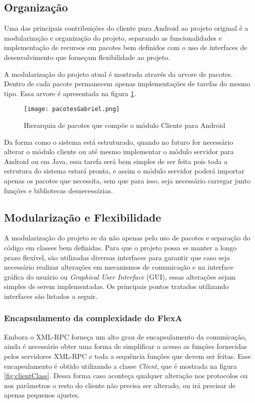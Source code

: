         \subsection{Organização}
        
        Uma das principais contribuições do cliente para Android ao projeto original é a modularização e organização do projeto, separando as funcionalidades e implementação de recursos em pacotes bem definidos com o uso de interfaces de desenvolvimento que forneçam flexibilidade ao projeto.
        
        A modularização do projeto atual é mostrada através da arvore de pacotes. Dentro de cada pacote permanecem apenas implementações de tarefas do mesmo tipo. Essa arvore é apresentada na figura \ref{fig:arvorePacotesAndroid}.
        
        \begin{figure}[!ht]
        \centering
        \texttt{[image: pacotesGabriel.png]}
        \caption{Hierarquia de pacotes que compõe o módulo Cliente para Android}
        \label{fig:arvorePacotesAndroid}
        \end{figure}
        
        Da forma como o sistema está estruturado, quando no futuro for necessário alterar o módulo cliente ou até mesmo implementar o módulo servidor para Android ou em Java, essa tarefa será bem simples de ser feita pois toda a estrutura do sistema estará pronta, e assim o módulo servidor poderá importar apenas os pacotes que necessita, sem que para isso, seja necessário carregar junto funções e bibliotecas desnecessárias.
        
        \subsection{Modularização e Flexibilidade}
        
        A modularização do projeto se da não apenas pelo uso de pacotes e separação do código em classes bem definidas. Para que o projeto possa se manter a longo prazo flexível, são utilizadas diversas interfaces para garantir que caso seja necessário realizar alterações em mecanismos de comunicação e na interface gráfica do usuário ou \textit{Graphical User Interface} (GUI), essas alterações sejam simples de serem implementadas. Os principais pontos tratados utilizando interfaces são listados a seguir.
        
       
         \subsubsection{Encapsulamento da complexidade do FlexA}
        Embora o XML-RPC forneça um alto grau de encapsulamento da comunicação, ainda é necessário obter uma forma de simplificar o acesso as funções fornecidas pelos servidores XML-RPC e toda a sequência funções que devem ser feitas. Esse encapsulamento é obtido utilizando a classe \textit{Client}, que é mostrada na figura \ref{fig:clientClass}. Dessa forma caso aconteça qualquer alteração nos protocolos ou nos parâmetros o resto do cliente não precisa ser alterado, ou irá precisar de apenas pequenos ajustes.
        
